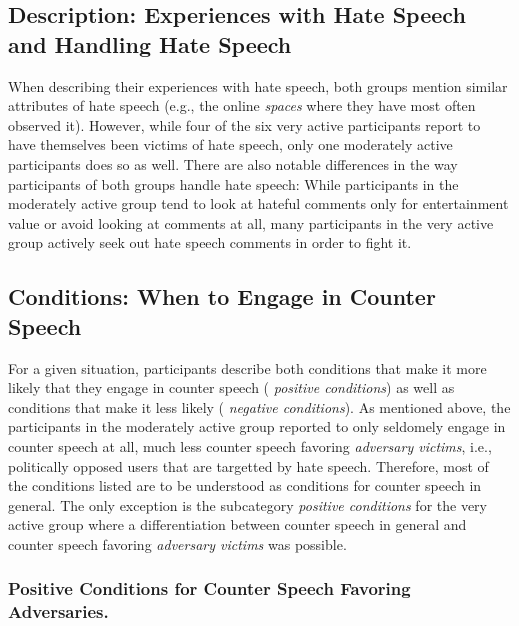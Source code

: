 \documentclass[runningheads]{llncs}
\begin{document}
\hypertarget{description-experiences-with-hate-speech-and-handling-hate-speech}{%
\subsection{Description: Experiences with Hate Speech and Handling Hate Speech}\label{description-experiences-with-hate-speech-and-handling-hate-speech}}

When describing their experiences with hate speech, both groups mention similar attributes of hate speech (e.g., the online \emph{spaces} where they have most often observed it). However, while four of the six very active participants report to have themselves been victims of hate speech, only one moderately active participants does so as well. There are also notable differences in the way participants of both groups handle hate speech: While participants in the moderately active group tend to look at hateful comments only for entertainment value or avoid looking at comments at all, many participants in the very active group actively seek out hate speech comments in order to fight it.

\hypertarget{conditions-when-to-engage-in-counter-speech}{%
\subsection{Conditions: When to Engage in Counter Speech}\label{conditions-when-to-engage-in-counter-speech}}

For a given situation, participants describe both conditions that make it more likely that they engage in counter speech ( \emph{positive conditions}) as well as conditions that make it less likely ( \emph{negative conditions}). As mentioned above, the participants in the moderately active group reported to only seldomely engage in counter speech at all, much less counter speech favoring \emph{adversary victims}, i.e., politically opposed users that are targetted by hate speech. Therefore, most of the conditions listed are to be understood as conditions for counter speech in general. The only exception is the subcategory \emph{positive conditions} for the very active group where a differentiation between counter speech in general and counter speech favoring \emph{adversary victims} was possible.

\hypertarget{positive-conditions-for-counter-speech-favoring-adversaries.}{%
\subsubsection{Positive Conditions for Counter Speech Favoring Adversaries.}\label{positive-conditions-for-counter-speech-favoring-adversaries.}}
\end{document}
